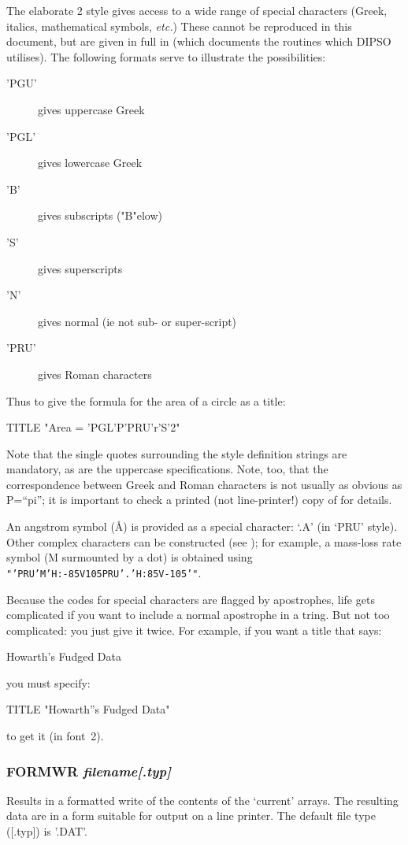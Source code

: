 \documentclass[twoside,11pt,noabs,nolof]{starlink}
\providecommand{\dipcom}[3]{\subsubsection*{\label{COM:#1}\textbf{#1} \emph{#2}}}
\newenvironment{dipdesc}{\begin{description}}{\end{description}}
\providecommand{\dipitem}[2]{ \item[{#1}] {#2} }
\begin{document}
The elaborate   2 style gives access to a wide range of special
characters (Greek, italics, mathematical symbols, \emph{etc.}) These
cannot be reproduced in this document, but are given in full in
(which documents the routines which DIPSO utilises). The following
formats serve to illustrate the possibilities:

\begin{dipdesc}
\dipitem {'PGU'}{ gives uppercase Greek}
\dipitem {'PGL'}{ gives lowercase Greek}
\dipitem {'B'}{ gives subscripts ("B"elow)}
\dipitem {'S'}{ gives superscripts}
\dipitem {'N'}{ gives normal (ie not sub- or super-script)}
\dipitem {'PRU'}{ gives Roman characters}
\end{dipdesc}

Thus to give the formula for the area of a circle as a title:

\begin{terminalv}
TITLE "Area = 'PGL'P'PRU'r'S'2"
\end{terminalv}

Note that the single quotes surrounding the style definition strings
are mandatory, as are the uppercase specifications. Note, too, that
the correspondence between Greek and Roman characters is not usually
as obvious as P=``pi''; it is important to check a printed (not
line-printer!) copy of  for details.

An angstrom symbol ({\AA}) is provided as a special character: `.A'
(in `PRU' style). Other complex characters can be constructed (see
); for example, a mass-loss rate symbol (M surmounted by a dot)
is obtained using {\texttt{"'PRU'M'H:-85V105PRU'.'H:85V-105'"}}.

Because the codes for special characters are flagged by apostrophes,
life gets complicated if you want to include a normal apostrophe in a
tring. But not too complicated: you just give it twice. For example,
if you want a title that says:

\begin{center}
Howarth's Fudged Data
\end{center}

you must specify:

\begin{terminalv}
TITLE "Howarth''s Fudged Data"
\end{terminalv}

to get it (in font~2).

\dipcom{FORMWR}{filename[.typ]}{Writes the contents of the current arrays to a text file}
Results in a formatted write of the contents of the `current' arrays.
The resulting data are in a form suitable for output on a line
printer. The default file type ([.typ]) is '.DAT'.
\end{document}
